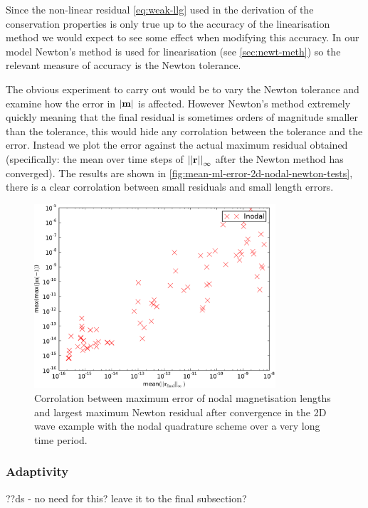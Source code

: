 Since the non-linear residual \eqref{eq:weak-llg} used in the derivation of the conservation properties is only true up to the accuracy of the linearisation method we would expect to see some effect when modifying this accuracy.
In our model Newton's method is used for linearisation (see \autoref{sec:newt-meth}) so the relevant measure of accuracy is the Newton tolerance.

The obvious experiment to carry out would be to vary the Newton tolerance and examine how the error in $\left|{\mathbf{m}} \right|$ is affected.
However Newton's method extremely quickly meaning that the final residual is sometimes orders of magnitude smaller than the tolerance, this would hide any corrolation between the tolerance and the error.
Instead we plot the error against the actual maximum residual obtained (specifically: the mean over time steps of $\left| \left| \mathbf{r} \right| \right|_\infty$ after the Newton method has converged). 
The results are shown in \autoref{fig:mean-ml-error-2d-nodal-newton-tests}, there is a clear corrolation between small residuals and small length errors.


\begin{figure}
  \centering
  \includegraphics[width=0.8\textwidth]
  {plots/2d_wave_solution_m_length_newton_res/-maxmaxmathbfm-1vsmeanmathbfr_mathrmfinal_infty.pdf}
  \caption{Corrolation between maximum error of nodal magnetisation lengths and largest maximum Newton residual after convergence in the 2D wave example with the nodal quadrature scheme over a very long time period.}
  \label{fig:mean-ml-error-2d-nodal-newton-tests}
\end{figure}


\subsubsection{Adaptivity}
??ds - no need for this? leave it to the final subsection?

